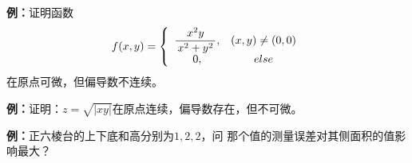 % 
% 

{\bf 例：}证明函数
  $$f(x,y)=\left\{\begin{array}{cc}
  	\displaystyle\frac{\,{x^2y}\,}{\,{x^2+y^2}\,},& (x,y)\ne (0,0)\\
  	0,& else
  \end{array}\right.$$
  在原点可微，但偏导数不连续。

{\bf 例：}证明：$z=\sqrt{|xy|}$在原点连续，偏导数存在，但不可微。

{\bf 例：}正六棱台的上下底和高分别为$1,2,2$，问
那个值的测量误差对其侧面积的值影响最大？


